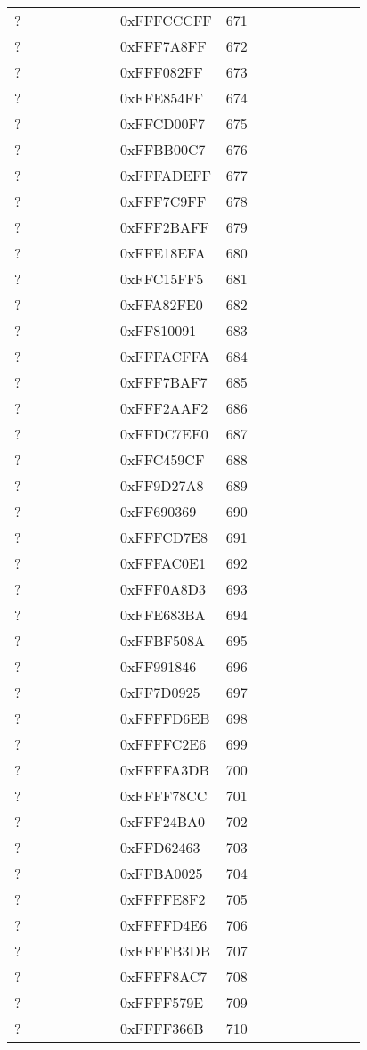\begin{longtable}{p{0.3\linewidth} p{0.3\linewidth} p{0.4\linewidth}}
? &  0xFFFCCCFF &  671\\
? &  0xFFF7A8FF &  672\\
? &  0xFFF082FF &  673\\
? &  0xFFE854FF &  674\\
? &  0xFFCD00F7 &  675\\
? &  0xFFBB00C7 &  676\\
? &  0xFFFADEFF &  677\\
? &  0xFFF7C9FF &  678\\
? &  0xFFF2BAFF &  679\\
? &  0xFFE18EFA &  680\\
? &  0xFFC15FF5 &  681\\
? &  0xFFA82FE0 &  682\\
? &  0xFF810091 &  683\\
? &  0xFFFACFFA &  684\\
? &  0xFFF7BAF7 &  685\\
? &  0xFFF2AAF2 &  686\\
? &  0xFFDC7EE0 &  687\\
? &  0xFFC459CF &  688\\
? &  0xFF9D27A8 &  689\\
? &  0xFF690369 &  690\\
? &  0xFFFCD7E8 &  691\\
? &  0xFFFAC0E1 &  692\\
? &  0xFFF0A8D3 &  693\\
? &  0xFFE683BA &  694\\
? &  0xFFBF508A &  695\\
? &  0xFF991846 &  696\\
? &  0xFF7D0925 &  697\\
? &  0xFFFFD6EB &  698\\
? &  0xFFFFC2E6 &  699\\
? &  0xFFFFA3DB &  700\\
? &  0xFFFF78CC &  701\\
? &  0xFFF24BA0 &  702\\
? &  0xFFD62463 &  703\\
? &  0xFFBA0025 &  704\\
? &  0xFFFFE8F2 &  705\\
? &  0xFFFFD4E6 &  706\\
? &  0xFFFFB3DB &  707\\
? &  0xFFFF8AC7 &  708\\
? &  0xFFFF579E &  709\\
? &  0xFFFF366B &  710\\

\end{longtable}
